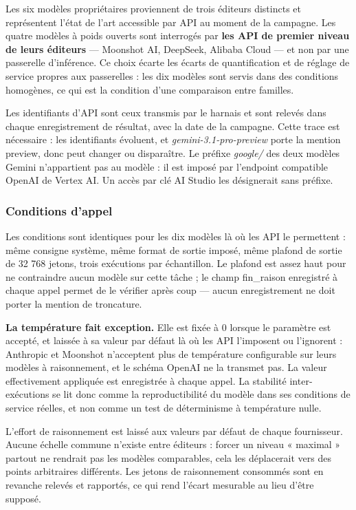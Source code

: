 Les six modèles propriétaires proviennent de trois éditeurs distincts et représentent l'état de l'art accessible par API au moment de la campagne. Les quatre modèles à poids ouverts sont interrogés par \textbf{les API de premier niveau de leurs éditeurs} --- Moonshot AI, DeepSeek, Alibaba Cloud --- et non par une passerelle d'inférence. Ce choix écarte les écarts de quantification et de réglage de service propres aux passerelles : les dix modèles sont servis dans des conditions homogènes, ce qui est la condition d'une comparaison entre familles.

Les identifiants d'API sont ceux transmis par le harnais et sont relevés dans chaque enregistrement de résultat, avec la date de la campagne. Cette trace est nécessaire : les identifiants évoluent, et \emph{gemini-3.1-pro-preview} porte la mention preview, donc peut changer ou disparaître. Le préfixe \emph{google/} des deux modèles Gemini n'appartient pas au modèle : il est imposé par l'endpoint compatible OpenAI de Vertex AI. Un accès par clé AI Studio les désignerait sans préfixe.

\subsubsection{Conditions d'appel}\label{sec:4-3}
Les conditions sont identiques pour les dix modèles là où les API le permettent : même consigne système, même format de sortie imposé, même plafond de sortie de 32 768 jetons, trois exécutions par échantillon. Le plafond est assez haut pour ne contraindre aucun modèle sur cette tâche ; le champ fin\_raison enregistré à chaque appel permet de le vérifier après coup --- aucun enregistrement ne doit porter la mention de troncature.

\textbf{La température fait exception.} Elle est fixée à 0 lorsque le paramètre est accepté, et laissée à sa valeur par défaut là où les API l'imposent ou l'ignorent : Anthropic et Moonshot n'acceptent plus de température configurable sur leurs modèles à raisonnement, et le schéma OpenAI ne la transmet pas. La valeur effectivement appliquée est enregistrée à chaque appel. La stabilité inter-exécutions se lit donc comme la reproductibilité du modèle dans ses conditions de service réelles, et non comme un test de déterminisme à température nulle.

L'effort de raisonnement est laissé aux valeurs par défaut de chaque fournisseur. Aucune échelle commune n'existe entre éditeurs : forcer un niveau « maximal » partout ne rendrait pas les modèles comparables, cela les déplacerait vers des points arbitraires différents. Les jetons de raisonnement consommés sont en revanche relevés et rapportés, ce qui rend l'écart mesurable au lieu d'être supposé.

